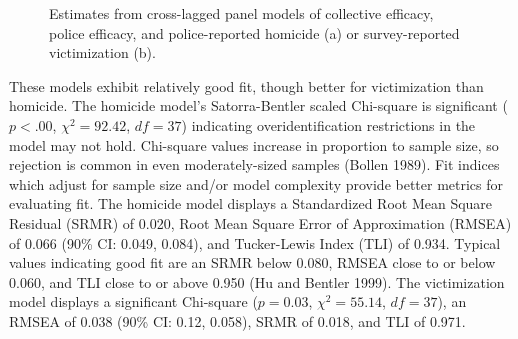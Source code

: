 \documentclass [11pt, proquest] {uwthesis}[2015/03/03]
\begin{document}
\begin{figure}

{\centering {}

}

\caption{Estimates from cross-lagged panel models of collective efficacy, police efficacy, and police-reported homicide (a) or survey-reported victimization (b).}\label{fig:crosslagresults}
\end{figure}
These models exhibit relatively good fit, though better for victimization than homicide. The homicide model's Satorra-Bentler scaled Chi-square is significant (\(p <.00\), \(\chi^{2} = 92.42\), \(df = 37\)) indicating overidentification restrictions in the model may not hold. Chi-square values increase in proportion to sample size, so rejection is common in even moderately-sized samples (Bollen 1989). Fit indices which adjust for sample size and/or model complexity provide better metrics for evaluating fit. The homicide model displays a Standardized Root Mean Square Residual (SRMR) of 0.020, Root Mean Square Error of Approximation (RMSEA) of 0.066 (90\% CI: 0.049, 0.084), and Tucker-Lewis Index (TLI) of 0.934. Typical values indicating good fit are an SRMR below 0.080, RMSEA close to or below 0.060, and TLI close to or above 0.950 (Hu and Bentler 1999). The victimization model displays a significant Chi-square (\(p = 0.03\), \(\chi^{2} = 55.14\), \(df = 37\)), an RMSEA of 0.038 (90\% CI: 0.12, 0.058), SRMR of 0.018, and TLI of 0.971.
\end{document}

